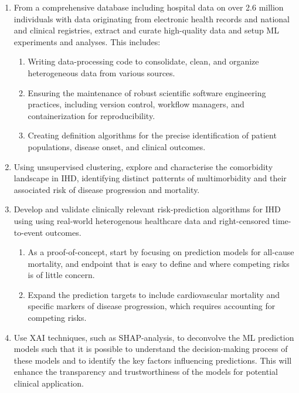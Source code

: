\begin{fullwidth}
\begin{multicols}{2}
\raggedcolumns

\begin{enumerate}
    \item From a comprehensive database including hospital data on
        over \num{2.6} million individuals with data 
        originating from electronic health records and
        national and clinical registries, extract and curate 
        high-quality data and setup \ac{ML} experiments and analyses.
        This includes:
    \begin{enumerate}
        \item Writing data-processing code to 
            consolidate, clean, and organize heterogeneous
            data from various sources.
        \item Ensuring the maintenance of robust scientific software 
            engineering practices, including version control, workflow
            managers, and containerization for reproducibility.
        \item Creating definition algorithms for the precise identification of 
            patient populations, disease onset, and clinical outcomes.
    \end{enumerate}
    \item Using unsupervised clustering, explore and characterise the 
        comorbidity landscape in \ac{IHD}, identifying distinct patternts
        of multimorbidity and their associated risk of disease progression
        and mortality.
    \item Develop and validate clinically relevant 
        risk-prediction algorithms for \ac{IHD} using using real-world 
        heterogenous healthcare data and right-censored time-to-event 
        outcomes.
    \begin{enumerate}
        \item As a proof-of-concept, start by focusing on prediction
            models for all-cause mortality, and endpoint that is easy to 
            define and where competing risks is of little concern.
        \item Expand the prediction targets to include cardiovascular
            mortality and specific markers of disease progression, 
            which requires accounting for competing risks.
    \end{enumerate}
    \item Use \ac{XAI} techniques, such as \ac{SHAP}-analysis, to deconvolve 
        the \ac{ML} prediction models such that it is possible to understand 
        the decision-making process of these models and to identify the key 
        factors influencing predictions. This will enhance the
        transparency and trustworthiness of the models for potential clinical 
        application.
\end{enumerate}

\end{multicols}
\end{fullwidth}

